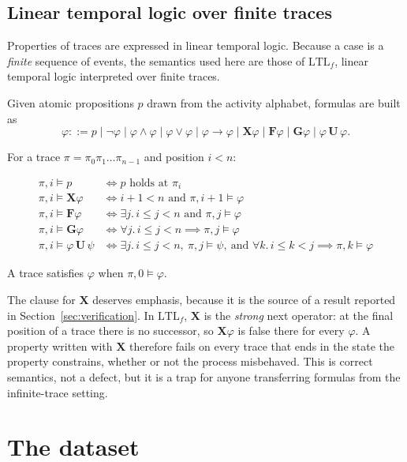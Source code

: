 \documentclass[12pt,a4paper]{article}
\begin{document}
\subsection{Linear temporal logic over finite traces}\label{sec:ltlf}

Properties of traces are expressed in linear temporal logic. Because a case is a
\emph{finite} sequence of events, the semantics used here are those of
$\text{LTL}_f$, linear temporal logic interpreted over finite traces.

Given atomic propositions $p$ drawn from the activity alphabet, formulas are
built as
\[
  \varphi ::= p \mid \neg\varphi \mid \varphi \wedge \varphi \mid
  \varphi \vee \varphi \mid \varphi \rightarrow \varphi \mid
  \mathbf{X}\varphi \mid \mathbf{F}\varphi \mid \mathbf{G}\varphi \mid
  \varphi \,\mathbf{U}\, \varphi .
\]

For a trace $\pi = \pi_0\pi_1\ldots\pi_{n-1}$ and position $i < n$:

\begin{align*}
  \pi, i \models p &\iff p \text{ holds at } \pi_i \\
  \pi, i \models \mathbf{X}\varphi &\iff i + 1 < n \text{ and } \pi, i+1 \models \varphi \\
  \pi, i \models \mathbf{F}\varphi &\iff \exists j.\, i \leq j < n \text{ and } \pi, j \models \varphi \\
  \pi, i \models \mathbf{G}\varphi &\iff \forall j.\, i \leq j < n \implies \pi, j \models \varphi \\
  \pi, i \models \varphi \,\mathbf{U}\, \psi &\iff
     \exists j.\, i \leq j < n,\ \pi, j \models \psi,\
     \text{and } \forall k.\, i \leq k < j \implies \pi, k \models \varphi
\end{align*}

A trace satisfies $\varphi$ when $\pi, 0 \models \varphi$.

The clause for $\mathbf{X}$ deserves emphasis, because it is the source of a
result reported in Section~\ref{sec:verification}. In $\text{LTL}_f$,
$\mathbf{X}$ is the \emph{strong} next operator: at the final position of a
trace there is no successor, so $\mathbf{X}\varphi$ is false there for every
$\varphi$. A property written with $\mathbf{X}$ therefore fails on every trace
that ends in the state the property constrains, whether or not the process
misbehaved. This is correct semantics, not a defect, but it is a trap for anyone
transferring formulas from the infinite-trace setting.

\section{The dataset}\label{sec:dataset}
\end{document}

